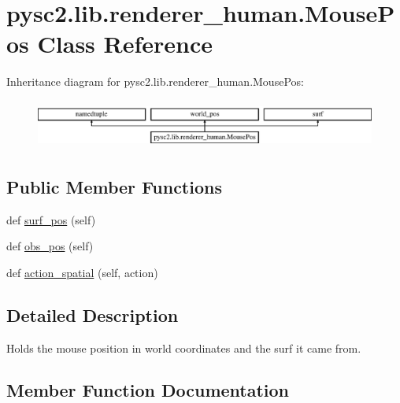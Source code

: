 \hypertarget{classpysc2_1_1lib_1_1renderer__human_1_1_mouse_pos}{}\section{pysc2.\+lib.\+renderer\+\_\+human.\+Mouse\+Pos Class Reference}
\label{classpysc2_1_1lib_1_1renderer__human_1_1_mouse_pos}
Inheritance diagram for pysc2.\+lib.\+renderer\+\_\+human.\+Mouse\+Pos\+:\begin{figure}[H]
\begin{center}
\leavevmode
\includegraphics[height=1.609195cm]{classpysc2_1_1lib_1_1renderer__human_1_1_mouse_pos}
\end{center}
\end{figure}
\subsection*{Public Member Functions}
\begin{DoxyCompactItemize}
\item 
def \mbox{\hyperlink{classpysc2_1_1lib_1_1renderer__human_1_1_mouse_pos_a8d72a4fa90ecbca1e8b5e1d033645d6f}{surf\+\_\+pos}} (self)
\item 
def \mbox{\hyperlink{classpysc2_1_1lib_1_1renderer__human_1_1_mouse_pos_a3d26543ccef50e87b90428956a43f918}{obs\+\_\+pos}} (self)
\item 
def \mbox{\hyperlink{classpysc2_1_1lib_1_1renderer__human_1_1_mouse_pos_a880ead5b5b1b5221a31389bf08806eb0}{action\+\_\+spatial}} (self, action)
\end{DoxyCompactItemize}


\subsection{Detailed Description}
\begin{DoxyVerb}Holds the mouse position in world coordinates and the surf it came from.\end{DoxyVerb}
 

\subsection{Member Function Documentation}
\mbox{\label{classpysc2_1_1lib_1_1renderer__human_1_1_mouse_pos_a880ead5b5b1b5221a31389bf08806eb0}} 
